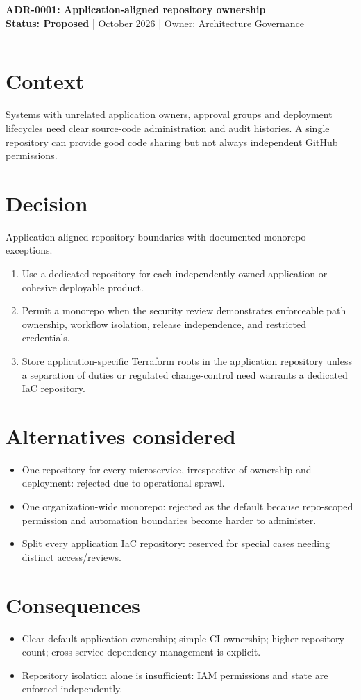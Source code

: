 \documentclass[11pt]{article}
\begin{document}
\begin{center}
{\LARGE\bfseries\color{Navy} ADR-0001: Application-aligned repository ownership }\\[4mm]
\textbf{Status: Proposed} \quad |  October 2026 \quad | \quad Owner: Architecture Governance
\end{center}
\hrule
\section*{Context}
Systems with unrelated application owners, approval groups and deployment lifecycles need clear source-code administration and audit histories. A single repository can provide good code sharing but not always independent GitHub permissions.
\section*{Decision}
Application-aligned repository boundaries with documented monorepo exceptions.
\begin{enumerate}[leftmargin=*]
\item Use a dedicated repository for each independently owned application or cohesive deployable product.
\item Permit a monorepo when the security review demonstrates enforceable path ownership, workflow isolation, release independence, and restricted credentials.
\item Store application-specific Terraform roots in the application repository unless a separation of duties or regulated change-control need warrants a dedicated IaC repository.
\end{enumerate}
\section*{Alternatives considered}
\begin{itemize}[leftmargin=*]
\item One repository for every microservice, irrespective of ownership and deployment: rejected due to operational sprawl.
\item One organization-wide monorepo: rejected as the default because repo-scoped permission and automation boundaries become harder to administer.
\item Split every application IaC repository: reserved for special cases needing distinct access/reviews.
\end{itemize}
\section*{Consequences}
\begin{itemize}[leftmargin=*]
\item Clear default application ownership; simple CI ownership; higher repository count; cross-service dependency management is explicit.
\item Repository isolation alone is insufficient: IAM permissions and state are enforced independently.
\end{itemize}
\end{document}
